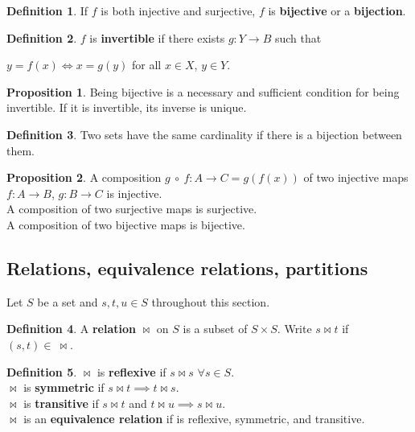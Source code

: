 \documentclass{article}
\theoremstyle{definition}
\newtheorem{definition}{Definition}[section]
\newtheorem{proposition}{Proposition}[section]
\begin{document}
\begin{definition}
If $f$ is both injective and surjective, $f$ is \textbf{bijective} or a \textbf{bijection}.
\end{definition}

\begin{definition}
$f$ is \textbf{invertible} if there exists $g: Y \rightarrow B$ such that 

\begin{center}
$y = f(x) \iff x = g(y)$ for all $x \in X$, $y \in Y$.
\end{center}

\end{definition}

\begin{proposition}
Being bijective is a necessary and sufficient condition for being invertible. If it is invertible, its inverse is unique.
\end{proposition}

\begin{definition}
Two sets have the same cardinality if there is a bijection between them.
\end{definition}

\begin{proposition}
A composition $g \ \circ \ f : A \rightarrow C  = g(f(x)) $ of two injective maps $f : A \rightarrow B$, $g: B \rightarrow C$ is injective. \\
A composition of two surjective maps is surjective. \\
A composition of two bijective maps is bijective.
\end{proposition}

\subsection{Relations, equivalence relations, partitions}

Let $S$ be a set and $s, t, u \in S$ throughout this section.

\begin{definition}
A \textbf{relation} $\bowtie$ on $S$ is a subset of $S \times S$. Write $s \bowtie t$ if $(s, t) \in \ \bowtie$.
\end{definition}

\begin{definition}
$\bowtie$ is \textbf{reflexive} if $s \bowtie s$ $\forall s \in S$. \\
$\bowtie$ is \textbf{symmetric} if $s \bowtie t \implies t \bowtie s$. \\
$\bowtie$ is \textbf{transitive} if $s \bowtie t$ and $t \bowtie u \implies s \bowtie u$. \\
$\bowtie$ is an \textbf{equivalence relation} if is reflexive, symmetric, and transitive.
\end{definition}
\end{document}

